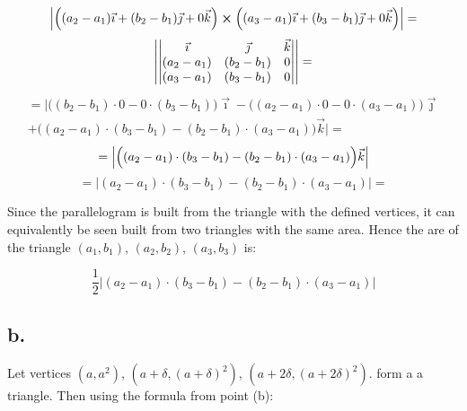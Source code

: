 \documentclass{article}
\begin{document}
\begin{equation*}
    \Big|\Big((a_{2} - a_{1})\vec{\imath} + (b_{2} - b_{1})\vec{\jmath} + 0\vec{k}\Big) \cross \Big((a_{3} - a_{1})\vec{\imath} + (b_{3} - b_{1})\vec{\jmath} + 0\vec{k}\Big)\Big| =
\end{equation*}
\begin{equation*}
    \abs{
\begin{vmatrix} 
    \vec{\imath} & \vec{\jmath} & \vec{k} \\
    (a_{2} - a_{1}) & (b_{2} - b_{1}) & 0 \\
    (a_{3} - a_{1}) & (b_{3} - b_{1}) & 0
\end{vmatrix}
    }
    =
\end{equation*}
\begin{multline*}
        = \Bigg|\Big( (b_{2} - b_{1}) \cdot 0 - 0 \cdot (b_{3} - b_{1}) \Big)\vec{\imath} - \Big( (a_{2} - a_{1}) \cdot 0 - 0 \cdot (a_{3} - a_{1}) \Big)\vec{\jmath} \\
        + \Big( (a_{2} - a_{1}) \cdot (b_{3} - b_{1}) - (b_{2} - b_{1}) \cdot (a_{3} - a_{1}) \Big)\vec{k}\Bigg| =
\end{multline*}
\begin{equation*}
    = \abs{\Big( (a_{2} - a_{1}) \cdot (b_{3} - b_{1}) - (b_{2} - b_{1}) \cdot (a_{3} - a_{1}) \Big)\vec{k}}
\end{equation*}
\begin{equation*}
    = \Big| (a_{2} - a_{1}) \cdot (b_{3} - b_{1}) - (b_{2} - b_{1}) \cdot (a_{3} - a_{1})\Big| =
\end{equation*}


Since the parallelogram is built from the triangle with the defined vertices, it can equivalently be seen built from two
triangles with the same area. Hence the are of the triangle \((a_{1}, b_{1})\), \((a_{2}, b_{2})\), \((a_{3}, b_{3})\) is:

\begin{equation*}
    \frac{1}{2} \Big| (a_{2} - a_{1}) \cdot (b_{3} - b_{1}) - (b_{2} - b_{1}) \cdot (a_{3} - a_{1})\Big|
\end{equation*}


\subsection*{b.}

Let vertices \((a, a^{2})\), \((a + \delta, (a + \delta)^{2})\), \((a + 2\delta, (a + 2\delta)^{2})\). form a
a triangle. Then using the formula from point (b):
\end{document}
